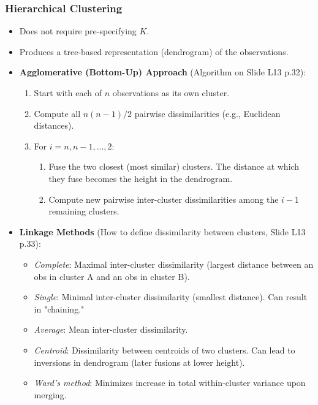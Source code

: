 \documentclass[12pt,a4paper]{article}
\begin{document}
    \subsubsection{Hierarchical Clustering }
        \begin{itemize}
            \item Does not require pre-specifying $K$.
            \item Produces a tree-based representation (dendrogram) of the observations.
            \item \textbf{Agglomerative (Bottom-Up) Approach} (Algorithm on Slide L13 p.32):
                \begin{enumerate}
                    \item Start with each of $n$ observations as its own cluster.
                    \item Compute all $n(n-1)/2$ pairwise dissimilarities (e.g., Euclidean distances).
                    \item For $i = n, n-1, \dots, 2$:
                        \begin{enumerate}
                            \item Fuse the two closest (most similar) clusters. The distance at which they fuse becomes the height in the dendrogram.
                            \item Compute new pairwise inter-cluster dissimilarities among the $i-1$ remaining clusters.
                        \end{enumerate}
                \end{enumerate}
            \item \textbf{Linkage Methods} (How to define dissimilarity between clusters, Slide L13 p.33):
                \begin{itemize}
                    \item \textit{Complete}: Maximal inter-cluster dissimilarity (largest distance between an obs in cluster A and an obs in cluster B).
                    \item \textit{Single}: Minimal inter-cluster dissimilarity (smallest distance). Can result in "chaining."
                    \item \textit{Average}: Mean inter-cluster dissimilarity.
                    \item \textit{Centroid}: Dissimilarity between centroids of two clusters. Can lead to inversions in dendrogram (later fusions at lower height).
                    \item \textit{Ward's method}: Minimizes increase in total within-cluster variance upon merging.

\end{itemize}
\end{itemize}
\end{document}

